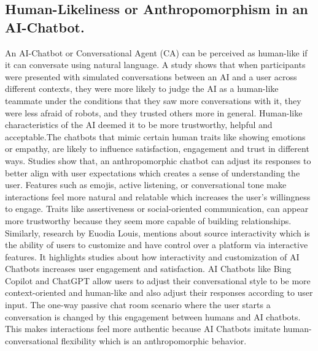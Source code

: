 \documentclass[conference]{IEEEtran}
\begin{document}
\subsection{Human-Likeliness or Anthropomorphism in an AI-Chatbot.}
An AI-Chatbot or Conversational Agent (CA) can be perceived as human-like if it can conversate using natural language. A study shows that when participants were presented with simulated conversations between an AI and a user across different contexts, they were more likely to judge the AI as a human-like teammate under the conditions that they saw more conversations with it, they were less afraid of robots, and they trusted others more in general. Human-like characteristics of the AI deemed it to be more trustworthy, helpful and acceptable\cite{b5}.The chatbots that mimic certain human traits like showing emotions or empathy, are likely to influence satisfaction, engagement and trust in different ways. Studies show that, an anthropomorphic chatbot can adjust its responses to better align with user expectations which creates a sense of understanding the user. Features such as emojis, active listening, or conversational tone make interactions feel more natural and relatable which increases the user’s willingness to engage. Traits like assertiveness or social-oriented communication, can appear more trustworthy because they seem more capable of building relationships\cite{b6}\cite{b7}\cite{b8}. Similarly, research by Euodia Louis\cite{b9}, mentions about source interactivity which is the ability of users to customize and have control over a platform via interactive features. It highlights studies about how interactivity and customization of AI Chatbots increases user engagement and satisfaction. AI Chatbots like Bing Copilot and ChatGPT allow users to adjust their conversational style to be more context-oriented and human-like and also adjust their responses according to user input. The one-way passive chat room scenario where the user starts a conversation is changed by this engagement between humans and AI chatbots. This makes interactions feel more authentic because AI Chatbots imitate human-conversational flexibility which is an anthropomorphic behavior.
\end{document}
